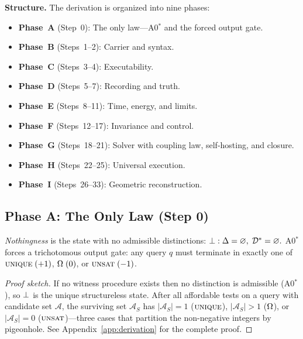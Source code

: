 \bigskip\noindent
\textbf{Structure.}  The derivation is organized into nine phases:
\begin{itemize}[nosep]
  \item \textbf{Phase~A} (Step~0): The only law---A0$^*$ and the forced output gate.
  \item \textbf{Phase~B} (Steps~1--2): Carrier and syntax.
  \item \textbf{Phase~C} (Steps~3--4): Executability.
  \item \textbf{Phase~D} (Steps~5--7): Recording and truth.
  \item \textbf{Phase~E} (Steps~8--11): Time, energy, and limits.
  \item \textbf{Phase~F} (Steps~12--17): Invariance and control.
  \item \textbf{Phase~G} (Steps~18--21): Solver with coupling law, self-hosting, and closure.
  \item \textbf{Phase~H} (Steps~22--25): Universal execution.
  \item \textbf{Phase~I} (Steps~26--33): Geometric reconstruction.
\end{itemize}

\subsection{Phase A: The Only Law (Step 0)}
\label{sec:derivation:law}

\begin{theorem}
\label{thm:nothingness}
\emph{Nothingness} is the state with no admissible distinctions:
$\bot : \Delta = \varnothing,\; \mathcal{D}^* = \varnothing.$
A0$^*$ forces a trichotomous output gate: any query $q$ must terminate in exactly one of
$\textsc{unique} \;(+1)$, $\Omega \;(0)$, or $\textsc{unsat} \;(-1)$.
\begin{proof}[Proof sketch]
If no witness procedure exists then no distinction is admissible (A0$^*$), so $\bot$ is the unique structureless state.  After all affordable tests on a query with candidate set $\mathcal{A}$, the surviving set $\mathcal{A}_S$ has $|\mathcal{A}_S| = 1$ ($\textsc{unique}$), $|\mathcal{A}_S| > 1$ ($\Omega$), or $|\mathcal{A}_S| = 0$ ($\textsc{unsat}$)---three cases that partition the non-negative integers by pigeonhole.
See Appendix~\ref{app:derivation} for the complete proof.
\end{proof}
\end{theorem}

